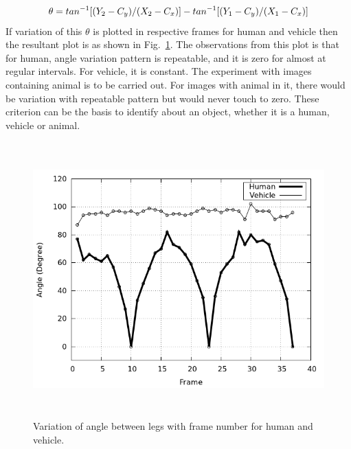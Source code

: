 \begin{enumerate}
%
	\begin{equation}
	\theta = tan^{-1}[(Y_2 - C_y) / (X_2 - C_x)] \\ - tan^{-1}[(Y_1 - C_y) / (X_1 - C_x)]
	\end{equation}
%
\indent If variation of this $\theta$ is plotted in respective frames
for human and vehicle then the resultant plot is as shown in
Fig.~\ref{angle_plot}. The observations from this plot is that for
human, angle variation pattern is repeatable, and it is zero for almost
at regular intervals. For vehicle, it is constant. The experiment with
images containing animal is to be carried out. For images with animal in
it, there would be variation with repeatable pattern but would never
touch to zero. These criterion can be the basis to identify about an
object, whether it is a human, vehicle or animal.

\begin{figure}[!b]
\centering
\includegraphics[height=300pt]{Figures/angle_plot}
\caption{Variation of angle between legs with frame number for human and
vehicle.}
\label{angle_plot}
\end{figure}


\end{enumerate}
